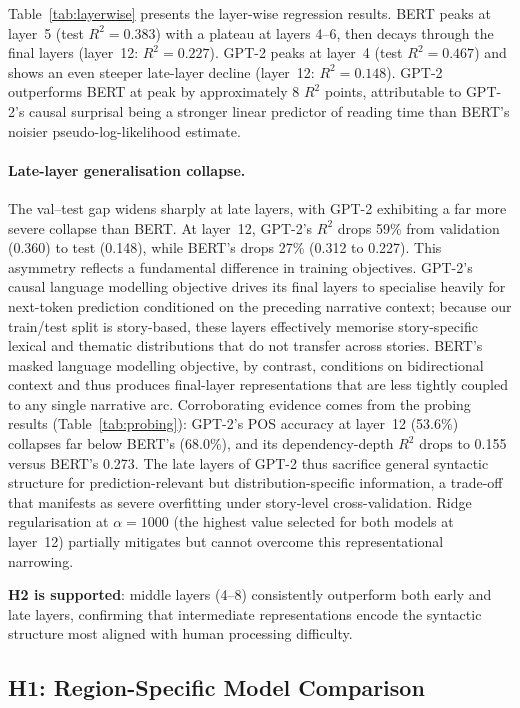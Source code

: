 \documentclass[11pt]{article}
\begin{document}
Table~\ref{tab:layerwise} presents the layer-wise regression results.
BERT peaks at layer~5 (test $R^2 = 0.383$) with a plateau at layers 4--6, then decays through the final layers (layer~12: $R^2 = 0.227$).
GPT-2 peaks at layer~4 (test $R^2 = 0.467$) and shows an even steeper late-layer decline (layer~12: $R^2 = 0.148$).
GPT-2 outperforms BERT at peak by approximately 8 $R^2$ points, attributable to GPT-2's causal surprisal being a stronger linear predictor of reading time than BERT's noisier pseudo-log-likelihood estimate.

\paragraph{Late-layer generalisation collapse.}
The val--test gap widens sharply at late layers, with GPT-2 exhibiting a far more severe collapse than BERT.
At layer~12, GPT-2's $R^2$ drops 59\% from validation (0.360) to test (0.148), while BERT's drops 27\% (0.312 to 0.227).
This asymmetry reflects a fundamental difference in training objectives.
GPT-2's causal language modelling objective drives its final layers to specialise heavily for next-token prediction conditioned on the preceding narrative context; because our train/test split is story-based, these layers effectively memorise story-specific lexical and thematic distributions that do not transfer across stories.
BERT's masked language modelling objective, by contrast, conditions on bidirectional context and thus produces final-layer representations that are less tightly coupled to any single narrative arc.
Corroborating evidence comes from the probing results (Table~\ref{tab:probing}): GPT-2's POS accuracy at layer~12 (53.6\%) collapses far below BERT's (68.0\%), and its dependency-depth $R^2$ drops to 0.155 versus BERT's 0.273.
The late layers of GPT-2 thus sacrifice general syntactic structure for prediction-relevant but distribution-specific information, a trade-off that manifests as severe overfitting under story-level cross-validation.
Ridge regularisation at $\alpha = 1000$ (the highest value selected for both models at layer~12) partially mitigates but cannot overcome this representational narrowing.

\textbf{H2 is supported}: middle layers (4--8) consistently outperform both early and late layers, confirming that intermediate representations encode the syntactic structure most aligned with human processing difficulty.

\subsection{H1: Region-Specific Model Comparison}
\end{document}

